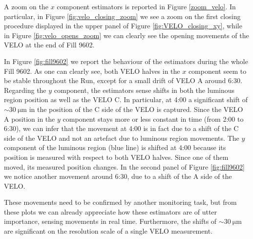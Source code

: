 A zoom on the $x$ component estimators is reported in Figure \ref{zoom_velo}. In particular, in Figure \ref{fig:velo_closing_zoom} we see a zoom on the first closing procedure displayed in the upper panel of Figure \ref{fig:VELO_closing_xy}, while in Figure \ref{fig:velo_opens_zoom} we can clearly see the opening movements of the VELO at the end of Fill 9602.

In Figure \ref{fig:fill9602} we report the behaviour of the estimators during the whole Fill 9602. As one can clearly see, both VELO halves in the $x$ component seem to be stable throughout the Run, except for a small drift of VELO A around 6:30. Regarding the $y$ component, the estimators sense shifts in both the luminous region position as well as the VELO C. In particular, at 4:00 a significant shift of $\sim\SI{30}{\micro\meter}$ in the position of the C side of the VELO is captured. Since the VELO A position in the $y$ component stays more or less constant in time (from 2:00 to 6:30), we can infer that the movement at 4:00 is in fact due to a shift of the C side of the VELO and not an artefact due to luminous region movements. The $y$ component of the luminous region (blue line) is shifted at 4:00 because its position is measured with respect to both VELO halves. Since one of them moved, its measured position changes. In the second panel of Figure \ref{fig:fill9602} we notice another movement around 6:30, due to a shift of the A side of the VELO.

These movements need to be confirmed by another monitoring task, but from these plots we can already appreciate how these estimators are of utter importance, sensing movements in real time. 
Furthermore, the shifts of $\sim\SI{30}{\micro\meter}$ are significant on the resolution scale of a single VELO measurement. 